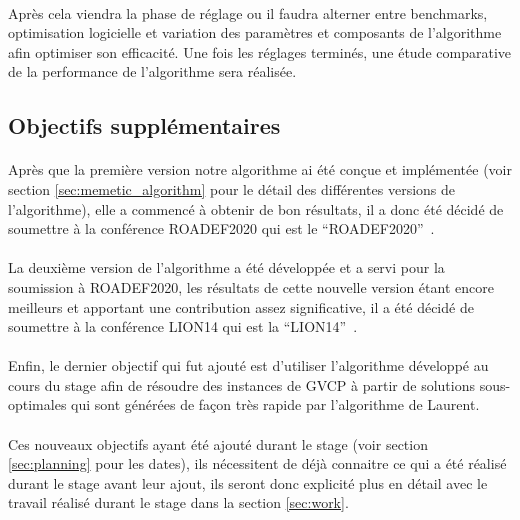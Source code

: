 \documentclass[a4paper,11pt,twoside,french,report]{../common/simplem}
\begin{document}
				\paragraph*{}
					Après cela viendra la phase de réglage ou il faudra alterner entre benchmarks, optimisation logicielle et variation des paramètres et composants de l'algorithme afin optimiser son efficacité. Une fois les réglages terminés, une étude comparative de la performance de l'algorithme sera réalisée.
			\subsection{Objectifs supplémentaires}
				\paragraph*{}
					Après que la première version notre algorithme ai été conçue et implémentée (voir section \ref{sec:memetic_algorithm} pour le détail des différentes versions de l'algorithme), elle a commencé à obtenir de bon résultats, il a donc été décidé de soumettre à la conférence \acrshort{ROADEF2020} qui est le ``\acrlong{ROADEF2020}''~\cite{ROADEF2020}.
				\paragraph*{}
					La deuxième version de l'algorithme a été développée et a servi pour la soumission à \acrshort{ROADEF2020}, les résultats de cette nouvelle version étant encore meilleurs et apportant une contribution assez significative, il a été décidé de soumettre à la conférence \acrshort{LION14} qui est la ``\acrlong{LION14}''~\cite{LION14}.
				\paragraph*{}
					Enfin, le dernier objectif qui fut ajouté est d'utiliser l'algorithme développé au cours du stage afin de résoudre des instances de \gls{GVCP} à partir de solutions sous-optimales qui sont générées de façon très rapide par l'algorithme de Laurent.
				\paragraph*{}
					Ces nouveaux objectifs ayant été ajouté durant le stage (voir section \ref{sec:planning} pour les dates), ils nécessitent de déjà connaitre ce qui a été réalisé durant le stage avant leur ajout, ils seront donc explicité plus en détail avec le travail réalisé durant le stage dans la section \ref{sec:work}.
\end{document}
